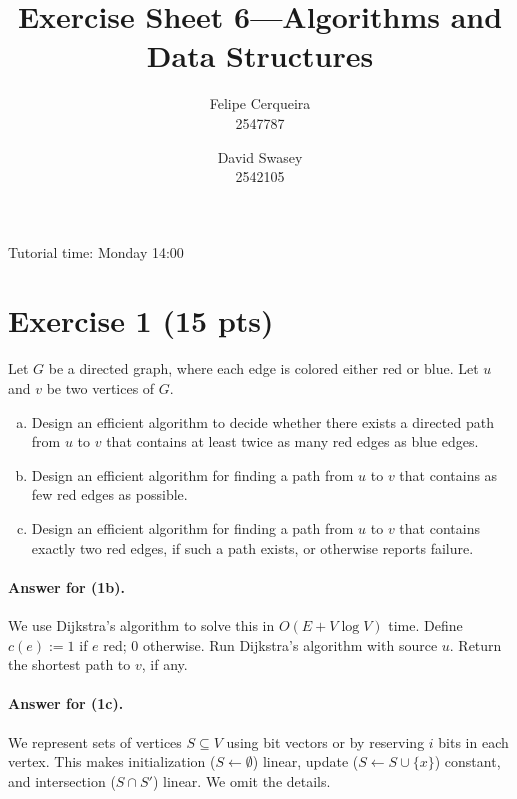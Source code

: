 \documentclass[a4paper]{article}
\title{Exercise Sheet 6---Algorithms and Data Structures}
\author{Felipe Cerqueira \\ 2547787 \and David Swasey \\ 2542105}
\begin{document}
\maketitle

Tutorial time: Monday 14:00

\section*{Exercise 1 (15 pts)}

Let $G$ be a directed graph, where each edge is colored either red or blue.
Let $u$ and $v$ be two vertices of $G$.
\begin{enumerate}[a)]
	\item Design an efficient algorithm to decide whether there exists a directed path from $u$ to $v$ that contains at least twice as many red edges as blue edges.
	
	\item Design an efficient algorithm for finding a path from $u$ to $v$ that contains as few red edges as possible.
	
	\item Design an efficient algorithm for finding a path from $u$ to $v$ that contains exactly two red edges, if such a path exists, or otherwise reports failure.
\end{enumerate}

\paragraph{Answer for (1b).}
We use Dijkstra's algorithm to solve this in $O(E + V \log V)$ time.
	Define $c(e) := 1$ if $e$ red; $0$ otherwise.
	Run Dijkstra's algorithm with source $u$.
	Return the shortest path to $v$, if any.

\paragraph{Answer for (1c).}
We represent sets of vertices $S \subseteq V$ using bit vectors or by reserving $i$ bits in each vertex.
This makes initialization ($S \gets \emptyset$) linear, update ($S \gets S \cup \{ x \}$) constant, and intersection ($S \cap S'$) linear.
We omit the details.
\end{document}
